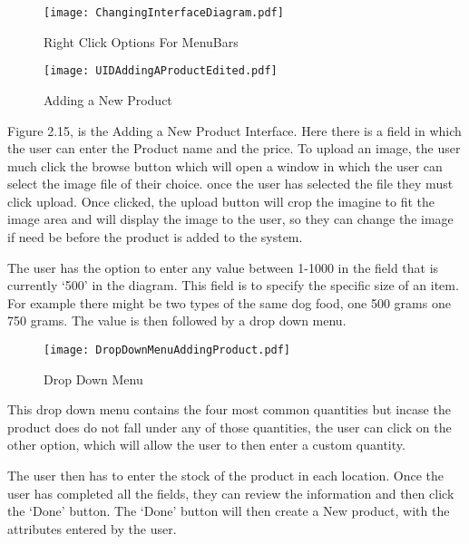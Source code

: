 \begin{figure}[H]
\caption{Right Click Options For MenuBars} \label{fig:Right Click Options For MenuBars}
\hfill\texttt{[image: ChangingInterfaceDiagram.pdf]}\hspace*{\fill}
\end{figure}

\pagebreak

\begin{figure}[H]
\caption{Adding a New Product} \label{fig:Adding a New Product Interface}
\hfill\texttt{[image: UIDAddingAProductEdited.pdf]}\hspace*{\fill}
\end{figure}

Figure 2.15, is the Adding a New Product Interface. Here there is a field in which the user can enter the Product name and the price. To upload an image, the user much click the browse button which will open a window in which the user can select the image file of their choice. once the user has selected the file they must click upload. Once clicked, the upload button will crop the imagine to fit the image area and will display the image to the user, so they can change the image if need be before the product is added to the system. \par

The user has the option to enter any value between 1-1000 in the field that is currently `500' in the diagram.  This field is to specify the specific size of an item. For example there might be two types of the same dog food, one 500 grams one 750 grams. The value is then followed by a drop down menu. \par


\begin{figure}[H]
\caption{Drop Down Menu} \label{fig:Drop Down Menu}
\hfill\texttt{[image: DropDownMenuAddingProduct.pdf]}\hspace*{\fill}
\end{figure}

This drop down menu contains the four most common quantities but incase the product does do not fall under any of those quantities, the user can click on the other option, which will allow the user to then enter a custom quantity. \par

The user then has to enter the stock of the product in each location. Once the user has completed all the fields, they can review the information and then click the `Done' button. The `Done' button will then create a New product, with the attributes entered by the user. \par

